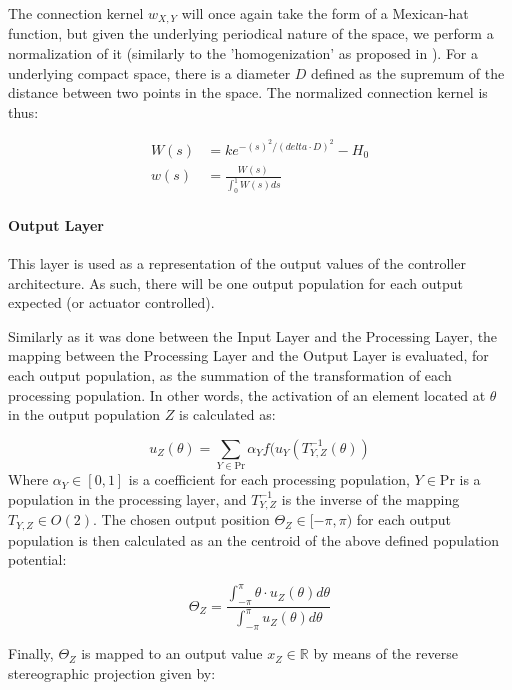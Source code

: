 The connection kernel $w_{X,Y}$ will once again take the form of a
Mexican-hat function, but given the underlying periodical nature of
the space, we perform a normalization of it (similarly to the
'homogenization' as proposed in
\cite{Ermentrout98Neural}). For a underlying compact space, there is a
diameter $D$ defined as the supremum of the distance between two
points in the space. The normalized connection kernel is thus: 

\begin{align}
\label{eq:norm-kernel}
  W(s)&=ke^{-(s)^2/(delta \cdot D)^2}-H_0\\
  w(s)&=\frac{W(s)}{\int_0^1W(s)ds}
\end{align}

\paragraph{Output Layer}
This layer is used as a representation of the output values of the
controller architecture. As such, there will be one output population
for each output expected (or actuator controlled).

Similarly as it was done between the Input Layer and the Processing
Layer, the mapping between the Processing Layer and the Output Layer
is evaluated, for each output population, as the summation of the
transformation of each processing population. In other words, the
activation of an element located at $\theta$ in the output population
$Z$ is calculated as:

\begin{equation}
  \label{eq:eqn-outlayer}
  u_Z(\theta)=\sum_{Y \in \mathrm{Pr}}\alpha_{Y}f(u_Y(T_{Y,Z}^{-1}(\theta))
\end{equation}
Where $\alpha_Y \in [0,1]$ is a coefficient for each processing
population, $Y \in$Pr is a population in the processing layer, and
$T_{Y,Z}^{-1}$ is the inverse of the mapping $T_{Y,Z} \in O(2)$.
The chosen output position $\Theta_Z \in [-\pi,\pi)$ for each output
population is then calculated as an the centroid of the above defined
population potential:

\begin{equation}
  \label{eq:eqn-outpos}
  \Theta_Z=\frac{\int_{-\pi}^{\pi}\theta \cdot u_Z(\theta)d\theta}{\int_{-\pi}^{\pi}u_Z(\theta)d\theta}
\end{equation}

Finally, $\Theta_Z$ is mapped to an output value $x_Z \in \mathbb{R}$
by means of the reverse stereographic projection given by:

